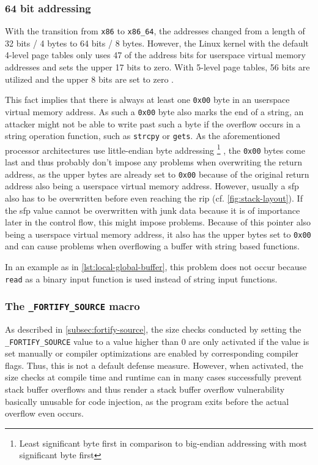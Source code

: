 \subsubsection{64 bit addressing}
\label{subsubsec:ci-64bit-addressing}

With the transition from \texttt{x86} to \texttt{x86\_64}, the addresses changed from a length of 32 bits / 4 bytes to 64 bits / 8 bytes.
However, the Linux kernel with the default 4-level page tables only uses 47 of the address bits for userspace virtual memory addresses and sets the upper 17 bits to zero.
With 5-level page tables, 56 bits are utilized and the upper 8 bits are set to zero \cite{Kernel2020}.

This fact implies that there is always at least one \texttt{0x00} byte in an userspace virtual memory address.
As such a \texttt{0x00} byte also marks the end of a string, an attacker might not be able to write past such a byte if the overflow occurs in a string operation function, such as \texttt{strcpy} or \texttt{gets}.
As the aforementioned processor architectures use little-endian byte addressing%
	\footnote{Least significant byte first in comparison to big-endian addressing with most significant byte first}%
, the \texttt{0x00} bytes come last and thus probably don't impose any problems when overwriting the return address, as the upper bytes are already set to \texttt{0x00} because of the original return address also being a userspace virtual memory address. 
However, usually a \gls{sfp} also has to be overwritten before even reaching the \gls{rip} (cf. \cref{fig:stack-layout}).
If the \gls{sfp} value cannot be overwritten with junk data because it is of importance later in the control flow, this might impose problems.
Because of this pointer also being a userspace virtual memory address, it also has the upper bytes set to \texttt{0x00} and can cause problems when overflowing a buffer with string based functions.

In an example as in \cref{lst:local-global-buffer}, this problem does not occur because \texttt{read} as a binary input function is used instead of string input functions.

\subsubsection{The \texttt{\_FORTIFY\_SOURCE} macro}
\label{subsubsec:ci-fortify-source}

As described in \cref{subsec:fortify-source}, the size checks conducted by setting the \texttt{\_FORTIFY\linebreak[0]\_SOURCE} value to a value higher than 0 are only activated if the value is set manually or compiler optimizations are enabled by corresponding compiler flags.
Thus, this is not a default defense measure.
However, when activated, the size checks at compile time and runtime can in many cases successfully prevent stack buffer overflows and thus render a stack buffer overflow vulnerability basically unusable for code injection, as the program exits before the actual overflow even occurs.

